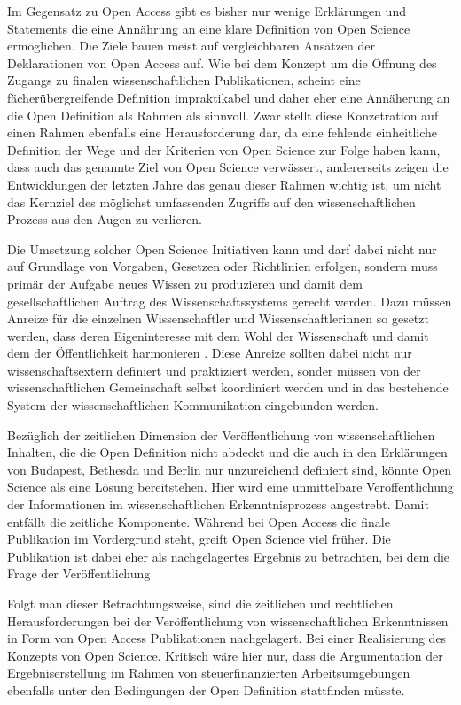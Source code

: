 Im Gegensatz zu Open Access gibt es bisher nur wenige Erklärungen und Statements die eine Annährung an eine klare Definition von Open Science ermöglichen. Die Ziele bauen meist auf vergleichbaren Ansätzen der Deklarationen von Open Access auf. Wie bei dem Konzept um die Öffnung des Zugangs zu finalen wissenschaftlichen Publikationen, scheint eine fächerübergreifende Definition impraktikabel und daher eher eine Annäherung an die Open Definition als Rahmen als sinnvoll. Zwar stellt diese Konzetration auf einen Rahmen ebenfalls eine Herausforderung dar, da eine fehlende einheitliche Definition der Wege und der Kriterien von Open Science zur Folge haben kann, dass auch das genannte Ziel von Open Science verwässert, andererseits zeigen die Entwicklungen der letzten Jahre das genau dieser Rahmen wichtig ist, um nicht das Kernziel des möglichst umfassenden Zugriffs auf den wissenschaftlichen Prozess aus den Augen zu verlieren.

Die Umsetzung solcher Open Science Initiativen kann und darf dabei nicht nur auf Grundlage von Vorgaben, Gesetzen oder Richtlinien erfolgen, sondern muss primär der Aufgabe neues Wissen zu produzieren und damit dem gesellschaftlichen Auftrag des Wissenschaftssystems gerecht werden. Dazu müssen Anreize für die einzelnen Wissenschaftler und Wissenschaftlerinnen so gesetzt werden, dass deren Eigeninteresse mit dem Wohl der Wissenschaft und damit dem der Öffentlichkeit harmonieren \cite{brembs2015open}. Diese Anreize sollten dabei nicht nur wissenschaftsextern definiert und praktiziert werden, sonder müssen von der wissenschaftlichen Gemeinschaft selbst koordiniert werden und in das bestehende System der wissenschaftlichen Kommunikation eingebunden werden.

Bezüglich der zeitlichen Dimension der Veröffentlichung von wissenschaftlichen Inhalten, die die Open Definition nicht abdeckt und die auch in den Erklärungen von Budapest, Bethesda und Berlin nur unzureichend definiert sind, könnte Open Science als eine Lösung bereitstehen. Hier wird eine unmittelbare Veröffentlichung der Informationen im wissenschaftlichen Erkenntnisprozess angestrebt. Damit entfällt die zeitliche Komponente. Während bei Open Access die finale Publikation im Vordergrund steht, greift Open Science viel früher. Die Publikation ist dabei eher als nachgelagertes Ergebnis zu betrachten, bei dem die Frage der Veröffentlichung

Folgt man dieser Betrachtungsweise, sind die zeitlichen und rechtlichen Herausforderungen bei der Veröffentlichung von wissenschaftlichen Erkenntnissen in Form von Open Access Publikationen nachgelagert. Bei einer Realisierung des Konzepts von Open Science. Kritisch wäre hier nur, dass die Argumentation der Ergebniserstellung im Rahmen von steuerfinanzierten Arbeitsumgebungen ebenfalls unter den Bedingungen der Open Definition stattfinden müsste.

